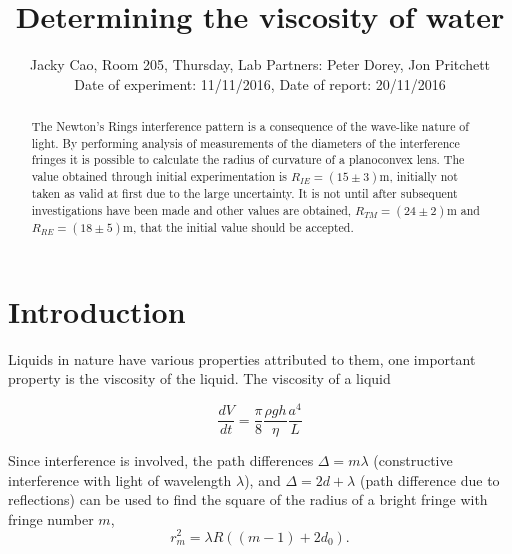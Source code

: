 \documentclass[twocolumn]{revtex4}
\begin{document}
\textheight=26.385cm

\title{Determining the viscosity of water} 
 
 
\author{Jacky Cao, Room 205, Thursday, Lab Partners: Peter Dorey, Jon Pritchett \\ Date of experiment: 11/11/2016, Date of report: 20/11/2016}


\begin{abstract}              
 
The Newton's Rings interference pattern is a consequence of the wave-like nature of light. By performing analysis of measurements of the diameters of the interference fringes it is possible to calculate the radius of curvature of a planoconvex lens. The value obtained through initial experimentation is $R_{IE}=(15\pm3)$m, initially not taken as valid at first due to the large uncertainty. It is not until after subsequent investigations have been made and other values are obtained, $R_{TM}=(24\pm2)$m and $R_{RE}=(18\pm5)$m, that the initial value should be accepted. 

\end{abstract}

\maketitle

\section{Introduction} 
\vspace{-2ex} 

Liquids in nature have various properties attributed to them, one important property is the viscosity of the liquid.  
The viscosity of a liquid 

\begin{equation} \tag{1}
\frac{dV}{dt}=\frac{\pi}{8}\frac{\rho gh}{\eta}\frac{a^4}{L}
\end{equation}

Since interference is involved, the path differences $\Delta=m\lambda$ (constructive interference with light of wavelength $\lambda$), and $\Delta=2d+\lambda$ (path difference due to reflections) can be used to find the square of the radius of a bright fringe with fringe number $m$,
\begin{equation} \tag{2}
r_m^2=\lambda{R((m-1)+2d_0)}.
\end{equation}
\end{document}
